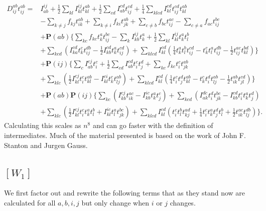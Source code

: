 \documentclass[a4paper,norsk,11pt,twoside]{report}
\begin{document}
\begin{align}
D_{ij}^{ab} t_{ij}^{ab} = & 
I_{ab}^{ij}
+ \frac{1}{2} \sum_{kl} I_{kl}^{ij} t_{kl}^{ab} 
+ \frac{1}{2} \sum_{cd} I_{ab}^{cd} t_{ij}^{cd}
+ \frac{1}{4} \sum_{klcd} I_{kl}^{cd}
t_{ij}^{cd} t_{kl}^{ab} 
 \nonumber \\ &
- \sum_{k \not= j} f_{kj} t_{ik}^{ab} 
+ \sum_{k \not= i} f_{ki} t_{jk}^{ab}
+ \sum_{c \not= b} f_{bc} t_{ij}^{ac}
- \sum_{c \not= a} f_{ac} t_{ij}^{bc}
 \nonumber \\ &
+ \textbf{P}(ab) 
\{
\sum_{kc} f_{kc} t_k^a t_{ij}^{bc}
- \sum_k I_{kb}^{ij} t_k^a
+ \frac{1}{2} \sum_{kl} I_{kl}^{ij} t_k^a t_l^b 
\nonumber \\ &
+ \sum_{kcd} 
(
I_{ka}^{cd} t_k^c t_{ij}^{db} 
- \frac{1}{2} I_{kb}^{cd} t_k^a t_{ij}^{cd} 
)
+ \sum_{klcd} I_{kl}^{cd} (\frac{1}{4} t_k^a t_l^b t_{ij}^{cd} - t_k^c t_l^a t_{ij}^{db} - \frac{1}{2} t_{ij}^{ac} t_{kl}^{bd})
\}
\nonumber \\ &
+ \textbf{P}(ij)
\{
\sum_c I_{ab}^{cj} t_i^c
+ \frac{1}{2} \sum_{cd} I_{ab}^{cd} t_i^c t_j^d 
+ \sum_{kc} f_{kc} t_i^c t_{jk}^{ab}
\nonumber \\ &
+ \sum_{klc}
( 
\frac{1}{2} 
I_{kl}^{cj} t_i^c t_{kl}^{ab}
- I_{kl}^{ci} t_k^c t_{lj}^{ab}
)
+ \sum_{klcd} I_{kl}^{cd}
(
\frac{1}{4} t_i^c t_j^d t_{kl}^{ab} 
- t_k^c t_i^d t_{lj}^{ab} 
- \frac{1}{2} t_{ik}^{ab} t_{jl}^{cd}
)
\}
\nonumber \\ &
+ \textbf{P}(ab) \textbf{P}(ij)
\{
\sum_{kc}
(
I_{kb}^{cj} t_{ik}^{ac}
- I_{kb}^{ic} t_k^a t_j^c
)
+ \sum_{kcd}
(
I_{ak}^{dc} t_i^d t_{jk}^{bc}
- I_{kb}^{cd} t_i^c t_k^a t_j^d
)
\nonumber \\ &
+ \sum_{klc}
(
\frac{1}{2} I_{kl}^{cj} t_i^c t_k^a t_l^b
+ I_{kl}^{ic} t_l^a t_{jk}^{bc}
)
+ \sum_{klcd} I_{kl}^{cd}
(
t_i^c t_l^b t_{kj}^{ad}
+ \frac{1}{4} t_i^c t_k^a t_j^d t_l^b
+ \frac{1}{2} t_{ik}^{ac} t_{lj}^{db} 
)
\} . 
\end{align}
Calculating this scales as $n^8$ and can go faster with the definition of intermediates. Much of the material presented is based on the work of John F. Stanton and Jurgen Gauss.

\subsection{$[W_1]$}

We first factor out and rewrite the following terms that as they stand now are calculated for all $a,b,i,j$ but only change when $i$ or $j$ changes.
\end{document}
